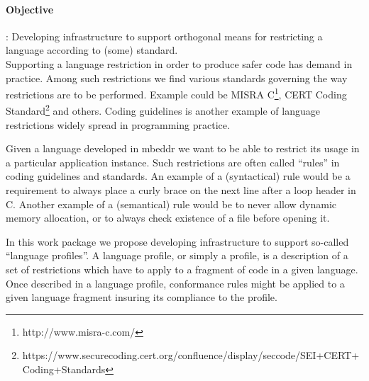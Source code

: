 \paragraph{\textbf{Objective}}: Developing infrastructure to support orthogonal
means for restricting a language according to (some) standard.\vspace{.2cm}\\
Supporting a language restriction in order to produce safer code has
demand in practice. Among such restrictions we find various standards
governing the way restrictions are to be performed. Example could be MISRA
C\footnote{http://www.misra-c.com/}, CERT Coding
Standard\footnote{https://www.securecoding.cert.org/confluence/display/seccode/SEI+CERT+Coding+Standards}
and others. Coding guidelines is another example of language restrictions 
widely spread in programming practice.

Given a language developed in mbeddr we want to be able to restrict its usage in
a particular application instance. Such restrictions are often called ``rules''
in coding guidelines and standards. An example of a (syntactical) rule would be
a requirement to always place a curly brace on the next line after a loop header
in C. Another example of a (semantical) rule would be to never allow dynamic
memory allocation, or to always check existence of a file before opening it.

In this work package we propose developing infrastructure to support
so-called ``language profiles''. A language profile, or simply a profile, is a
description of a set of restrictions which have to apply to a fragment of code
in a given language. Once described in a language profile, conformance rules
might be applied to a given language fragment insuring its compliance to the profile.
  
